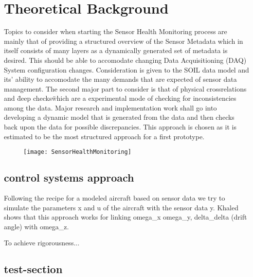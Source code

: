 \chapter{Theoretical Background}

Topics to consider when starting the Sensor Health Monitoring process are mainly that of providing a structured
overview of the Sensor Metadata which in itself consists of many layers as a dynamically generated set of metadata is
desired. This should be able to accomodate changing Data Acquisitioning (DAQ) System configuration changes.
Consideration is given to the SOIL data model and its' ability to accomodate the many demands that are expected of
sensor data management. \cite{SOIL model}
The second major part to consider is that of physical crossrelations and \"deep checks\" which are a experimental mode of checking for inconsistencies among the data.
Major research and implementation work shall go into developing a dynamic model that is generated from the data and then checks back upon the data for possible discrepancies. This approach is chosen as it is estimated to be the most structured approach for a first prototype.



\begin{figure}[h]
         \centering
         \texttt{[image: SensorHealthMonitoring]}
         \caption{}
         \label{fig:}
\end{figure}

\section{control systems approach}

Following the recipe for a modeled aircraft based on sensor data we try to simulate the parameters x and u of the
aircraft with the sensor data y. Khaled shows that this approach works for linking omega_x omega_y, delta_delta
(drift angle) with
omega_z.


To achieve rigorousness... \cite[80]{HEVN04}

\cite{HEVN04}


\Blindtext[10]

\section{test-section}

\Blindtext[4]